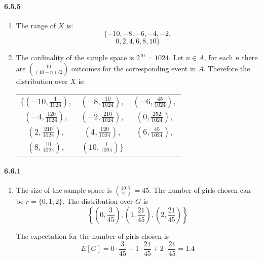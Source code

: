 \documentclass[11pt, letterpaper, twocolumn, fleqn]{article}
\begin{document}
\paragraph{6.5.5}
\begin{enumerate}
  \item The range of $X$ is:
    $$\{-10,-8,-6,-4,-2,$$
    $$0,2,4,6,8,10\}$$
  
  \item The cardinality of the sample space is $2^{10} = 1024$. Let $n \in A$, for each $n$ there are $\binom{10}{(10-n)/2}$ outcomes for the corresponding event in $A$. Therefore the distribution over $X$ is:
  
  \begin{center}
  \begin{tabular}{c c c}
     $\{\left(-10,\frac{1  }{1024} \right),$
      &$\left(-8 ,\frac{10 }{1024} \right),$ 
      &$\left(-6 ,\frac{45 }{1024} \right),$ \\
       $\left(-4 ,\frac{120}{1024} \right),$ 
      &$\left(-2 ,\frac{210}{1024} \right),$ 
      &$\left(0  ,\frac{252}{1024} \right),$ \\
       $\left(2  ,\frac{210}{1024} \right),$
      &$\left(4  ,\frac{120}{1024} \right),$
      &$\left(6  ,\frac{45 }{1024} \right),$ \\
       $\left(8  ,\frac{10 }{1024} \right),$
      &$\left(10 ,\frac{1  }{1024} \right) \}$ 
  \end{tabular}
  \end{center}
\end{enumerate}

\paragraph{6.6.1}
\begin{enumerate}
  \item The size of the sample space is $\binom{10}{2} = 45$. The number of girls chosen can be $r = \{0,1,2\}$. The distribution over $G$ is 
    $$\left\{
      \left(0,\frac{3 }{45}\right),
      \left(1,\frac{21}{45}\right),
      \left(2,\frac{21}{45}\right)
    \right\}$$
    
  The expectation for the number of girls chosen is 
    $$E[G] = 0\cdot\frac{3 }{45} + 1\cdot\frac{21}{45} + 2\cdot\frac{21}{45} = 1.4$$
\end{enumerate}
\end{document}
